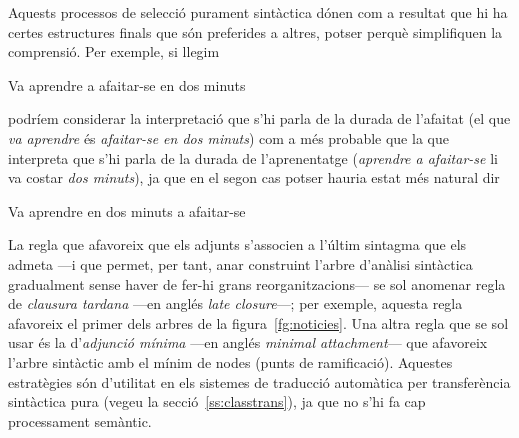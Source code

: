 Aquests processos de selecció purament sintàctica dónen com a resultat
que hi ha certes estructures finals que són preferides a altres,
potser perquè simplifiquen la comprensió.  Per exemple, si llegim
\begin{exemple}
Va aprendre a afaitar-se en dos minuts
\end{exemple} 
podríem considerar la interpretació que s'hi parla de la durada de
l'afaitat (el que \emph{va aprendre} és \emph{afaitar-se en dos
  minuts}) com a més probable que la que interpreta que s'hi parla de
la durada de l'aprenentatge (\emph{aprendre a afaitar-se} li va costar
\emph{dos minuts}), ja que en el segon cas potser hauria estat més
natural dir
\begin{exemple}
Va aprendre en dos minuts a afaitar-se
\end{exemple}
La regla que afavoreix que els adjunts s'associen a l'últim sintagma
que els admeta ---i que permet, per tant, anar construint l'arbre
d'anàlisi sintàctica gradualment sense haver de fer-hi grans
reorganitzacions--- se sol anomenar regla de \emph{clausura tardana}
---en anglés \emph{late closure}---; per exemple, aquesta regla
afavoreix el primer dels arbres de la figura~\ref{fg:noticies}. Una
altra regla que se sol usar és la d'\emph{adjunció mínima} ---en
anglés \emph{minimal attachment}--- que afavoreix l'arbre sintàctic
amb el mínim de nodes (punts de ramificació).  Aquestes estratègies
són d'utilitat en els sistemes de traducció automàtica per
transferència sintàctica pura (vegeu la secció~\ref{ss:classtrans}),
ja que no s'hi fa cap processament semàntic.

